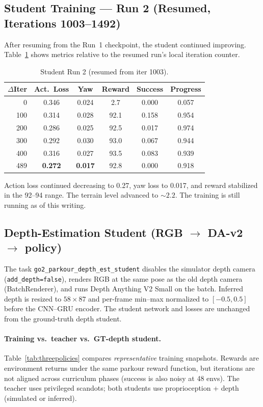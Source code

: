 \documentclass[11pt,a4paper]{article}
\begin{document}
\subsection{Student Training --- Run 2 (Resumed, Iterations 1003--1492)}

After resuming from the Run~1 checkpoint, the student continued improving.
Table~\ref{tab:student2} shows metrics relative to the resumed run's local
iteration counter.

\begin{table}[ht]
\centering
\caption{Student Run 2 (resumed from iter 1003).}
\label{tab:student2}
\begin{tabular}{rccccc}
\toprule
$\Delta$Iter & Act.\ Loss & Yaw & Reward & Success & Progress \\
\midrule
0     & 0.346 & 0.024 &  2.7  & 0.000 & 0.057 \\
100   & 0.314 & 0.028 & 92.1  & 0.158 & 0.954 \\
200   & 0.286 & 0.025 & 92.5  & 0.017 & 0.974 \\
300   & 0.292 & 0.030 & 93.0  & 0.067 & 0.944 \\
400   & 0.316 & 0.027 & 93.5  & 0.083 & 0.939 \\
489   & \textbf{0.272} & \textbf{0.017} & 92.8  & 0.000 & 0.918 \\
\bottomrule
\end{tabular}
\end{table}

Action loss continued decreasing to 0.27, yaw loss to 0.017, and reward
stabilized in the 92--94 range. The terrain level advanced to ${\sim}2.2$.
The training is still running as of this writing.

\subsection{Depth-Estimation Student (RGB $\rightarrow$ DA-v2 $\rightarrow$ policy)}

The task \texttt{go2\_parkour\_depth\_est\_student} disables the simulator depth
camera (\texttt{add\_depth=false}), renders RGB at the same pose as the old depth
camera (BatchRenderer), and runs Depth Anything V2 Small on the batch. Inferred
depth is resized to $58 \times 87$ and per-frame min--max normalized to
$[-0.5,0.5]$ before the CNN--GRU encoder. The student network and losses are
unchanged from the ground-truth depth student.

\paragraph{Training vs.\ teacher vs.\ GT-depth student.}
Table~\ref{tab:threepolicies} compares \emph{representative} training snapshots.
Rewards are environment returns under the same parkour reward function, but
iterations are not aligned across curriculum phases (success is also noisy at
48 envs). The teacher uses privileged scandots; both students use
proprioception + depth (simulated or inferred).
\end{document}
